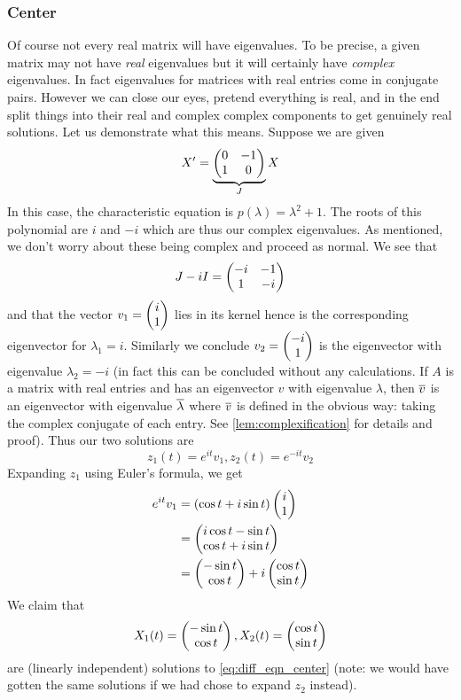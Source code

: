 \subsubsection{Center}
Of course not every real matrix will have eigenvalues. To be precise, a given matrix may not have \textit{real} eigenvalues but it will certainly have \textit{complex} eigenvalues. In fact eigenvalues for matrices with real entries come in conjugate pairs. However we can close our eyes, pretend everything is real, and in the end split things into their real and complex complex components to get genuinely real solutions. Let us demonstrate what this means. Suppose we are given
\begin{equation}\label{eq:diff_eqn_center}
    X' = \underbrace{\begin{pmatrix} 0 & -1\\1 & 0 \end{pmatrix}}_{J} X
\end{equation}
In this case, the characteristic equation is $p(\lambda) = \lambda^2 + 1$. The roots of this polynomial are $i$ and $-i$ which are thus our complex eigenvalues. As mentioned, we don't worry about these being complex and proceed as normal. We see that
\begin{align*}
    J - iI = \begin{pmatrix} -i & -1\\1 & -i \end{pmatrix}
\end{align*}
and that the vector $v_1 = \begin{pmatrix} i \\ 1 \end{pmatrix}$ lies in its kernel hence is the corresponding eigenvector for $\lambda_1 = i$. Similarly we conclude $v_2 = \begin{pmatrix} -i \\ 1 \end{pmatrix}$ is the eigenvector with eigenvalue $\lambda_2 = -i$ (in fact this can be concluded without any calculations. If $A$ is a matrix with real entries and has an eigenvector $v$ with eigenvalue $\lambda$, then $\overline{v}$ is an eigenvector with eigenvalue $\overline{\lambda}$ where $\overline{v}$ is defined in the obvious way: taking the complex conjugate of each entry. See \autoref{lem:complexification} for details and proof). Thus our two solutions are
$$ z_1(t) = e^{it} v_1, z_2(t) = e^{-it} v_2  $$
Expanding $z_1$ using Euler's formula, we get
\begin{align*}
    e^{it} v_1 &= (\cos t + i \sin t) \begin{pmatrix} i\\1 \end{pmatrix}\\
    &= \begin{pmatrix} i \cos t - \sin t  \\ \cos t + i \sin t \end{pmatrix}\\
    &= \begin{pmatrix} -\sin t \\ \cos t \end{pmatrix} + i \begin{pmatrix} \cos t \\ \sin t \end{pmatrix}
\end{align*}
We claim that
$$X_1(t) = \begin{pmatrix} -\sin t \\ \cos t \end{pmatrix}, X_2(t) = \begin{pmatrix} \cos t \\ \sin t \end{pmatrix}$$
are (linearly independent) solutions to \autoref{eq:diff_eqn_center} (note: we would have gotten the same solutions if we had chose to expand $z_2$ instead).

